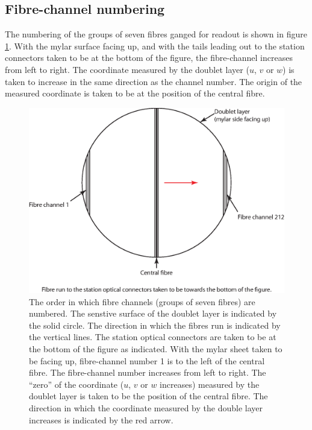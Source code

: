 \subsection{Fibre-channel numbering}
\label{SubSect:FbrNmbrng}

The numbering of the groups of seven fibres ganged for readout is
shown in figure \ref{Fig:FbrChnlNmbrng}.
With the mylar surface facing up, and with the tails leading out to
the station connectors taken to be at the bottom of the figure, the
fibre-channel increases from left to right.
The coordinate measured by the doublet layer ($u$, $v$ or $w$) is
taken to increase in the same direction as the channel number.
The origin of the measured coordinate is taken to be at the position
of the central fibre.
\begin{figure}
  \begin{center}
    \includegraphics[width=0.75\linewidth]
      {02-Definitions/Figures/fibre-channel-numbering.eps}
  \end{center}
  \caption{
    The order in which fibre channels (groups of seven fibres) are 
    numbered.
    The senstive surface of the doublet layer is indicated by the
    solid circle.
    The direction in which the fibres run is indicated by the vertical
    lines. 
    The station optical connectors are taken to be at the bottom of
    the figure as indicated.
    With the mylar sheet taken to be facing up, fibre-channel number 1
    is to the left of the central fibre.
    The fibre-channel number increases from left to right.
    The ``zero'' of the coordinate ($u$, $v$ or $w$ increases)
    measured by the doublet layer is taken to be the position of the
    central fibre.
    The direction in which the coordinate measured by the double 
    layer increases is indicated by the red arrow. 
  }
  \label{Fig:FbrChnlNmbrng}
\end{figure}
